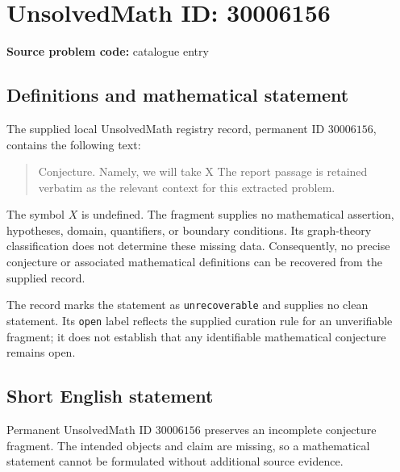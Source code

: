 \documentclass[11pt]{article}
\begin{document}
\section*{UnsolvedMath ID: 30006156}
\textbf{Source problem code:} catalogue entry
\subsection{Definitions and mathematical statement}
The supplied local UnsolvedMath registry record, permanent ID \(30006156\), contains the following text:
\begin{quote}
Conjecture. Namely, we will take X The report passage is retained verbatim as the relevant context for this extracted problem.
\end{quote}
The symbol \(X\) is undefined. The fragment supplies no mathematical assertion, hypotheses, domain, quantifiers, or boundary conditions. Its graph-theory classification does not determine these missing data. Consequently, no precise conjecture or associated mathematical definitions can be recovered from the supplied record.

The record marks the statement as \texttt{unrecoverable} and supplies no clean statement. Its \texttt{open} label reflects the supplied curation rule for an unverifiable fragment; it does not establish that any identifiable mathematical conjecture remains open.
\subsection{Short English statement}
Permanent UnsolvedMath ID \(30006156\) preserves an incomplete conjecture fragment. The intended objects and claim are missing, so a mathematical statement cannot be formulated without additional source evidence.
\end{document}
